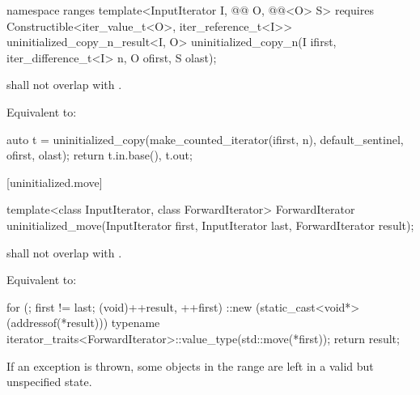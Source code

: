 \begin{addedblock}
%
\begin{itemdecl}
namespace ranges {
  template<InputIterator I, @@ O, @@<O> S>
      requires Constructible<iter_value_t<O>, iter_reference_t<I>>
    uninitialized_copy_n_result<I, O>
      uninitialized_copy_n(I ifirst, iter_difference_t<I> n, O ofirst, S olast);
}
\end{itemdecl}

\begin{itemdescr}
\pnum
\expects
{} shall not overlap with
.

\pnum
\effects Equivalent to:
\begin{codeblock}
auto t = uninitialized_copy(make_counted_iterator(ifirst, n),
                            default_sentinel{}, ofirst, olast);
return {t.in.base(), t.out};
\end{codeblock}
\end{itemdescr}
\end{addedblock}

[uninitialized.move]{}

%
\begin{itemdecl}
template<class InputIterator, class ForwardIterator>
  ForwardIterator uninitialized_move(InputIterator first, InputIterator last,
                                     ForwardIterator result);
\end{itemdecl}

\begin{itemdescr}
\begin{addedblock}
\pnum
\expects
{} shall not overlap with .
\end{addedblock}

\pnum
\effects
Equivalent to:
\begin{codeblock}
for (; first != last; (void)++result, ++first)
  ::new (static_cast<void*>(addressof(*result)))
    typename iterator_traits<ForwardIterator>::value_type(std::move(*first));
return result;
\end{codeblock}

\pnum
\remarks
If an exception is thrown, some objects in the range 
are left in a valid but unspecified state.
\end{itemdescr}

